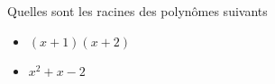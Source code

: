 \bexo
Quelles sont les racines des polynômes suivants
\begin{itemize}
	\item $(x+1)(x+2)$
	\item $x^2+x-2$
\end{itemize}
\eexo
{}
